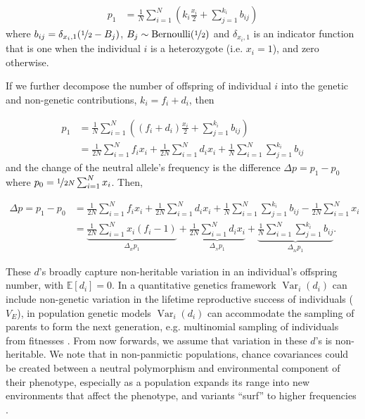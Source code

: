 \documentclass[11pt]{article}
\newcommand{\E}{\mathbb{E}}
\DeclareMathOperator{\var}{Var}
\begin{document}
\begin{align}
  p_1 &= \frac{1}{N} \sum_{i=1}^N \left(k_i \frac{x_i}{2} + \sum_{j=1}^{k_i} b_{ij} \right)
\end{align}
%
where $b_{ij} = \delta_{x_i, 1} (\nicefrac{1}{2} - B_j)$, $B_j \sim
\text{Bernoulli}(\nicefrac{1}{2})$ and $\delta_{x_i, 1}$ is an indicator
function that is one when the individual $i$ is a heterozygote (i.e. $x_i=1$),
and zero otherwise.

If we further decompose the number of offspring of individual $i$ into the
genetic and non-genetic contributions, $k_i = f_i + d_i$, then

\begin{align}
  p_1 &= \frac{1}{N} \sum_{i=1}^N \left( (f_i + d_i) \frac{x_i}{2} + \sum_{j=1}^{k_i} b_{ij} \right) \nonumber \\
      &= \frac{1}{2N} \sum_{i=1}^N f_i x_i + \frac{1}{2N} \sum_{i=1}^N d_i x_i + \frac{1}{N} \sum_{i=1}^N  \sum_{j=1}^{k_i} b_{ij} 
\end{align}
%
and the change of the neutral allele's frequency is the difference $\Delta p = p_1 - p_0$ where $p_0 = \nicefrac{1}{2N} \sum_{i=1}^{N} x_i$. Then,

\begin{align}
\Delta p = p_1 - p_0 &= \frac{1}{2N} \sum_{i=1}^N f_i x_i + \frac{1}{2N} \sum_{i=1}^N d_i x_i + \frac{1}{N} \sum_{i=1}^N  \sum_{j=1}^{k_i} b_{ij} - \frac{1}{2N} \sum_{i=1}^N x_i \nonumber \\
                     &= \underbrace{\frac{1}{2N}\sum_{i=1}^N x_i (f_i - 1)}_{\Delta_{_H} p_1} + \underbrace{\frac{1}{2N} \sum_{i=1}^N d_i x_i}_{\Delta_{_N} p_1} + \underbrace{\frac{1}{N} \sum_{i=1}^N \sum_{j=1}^{k_i} b_{ij}}_{\Delta_{_M} p_1}.
\end{align}
%

These $d$'s broadly capture non-heritable variation in an individual's
offspring number, with $\E[d_i]=0$. In a quantitative genetics framework
$\var_i(d_i)$ can include non-genetic variation in the lifetime reproductive
success of individuals ($V_E$), in population genetic models $\var_i(d_i)$ can
accommodate the sampling of parents to form the next generation, e.g.
multinomial sampling of individuals from fitnesses \parencite{Santiago1995-hx}.
From now forwards, we assume that variation in these $d$'s is non-heritable. We
note that in non-panmictic populations, chance covariances could be created
between a neutral polymorphism and environmental component of their phenotype,
especially as a population expands its range into new environments that affect
the phenotype, and variants ``surf'' to higher frequencies
\parencite{Edmonds2004-xf,Hallatschek2008-mn,Excoffier2008-ep}.
\end{document}
